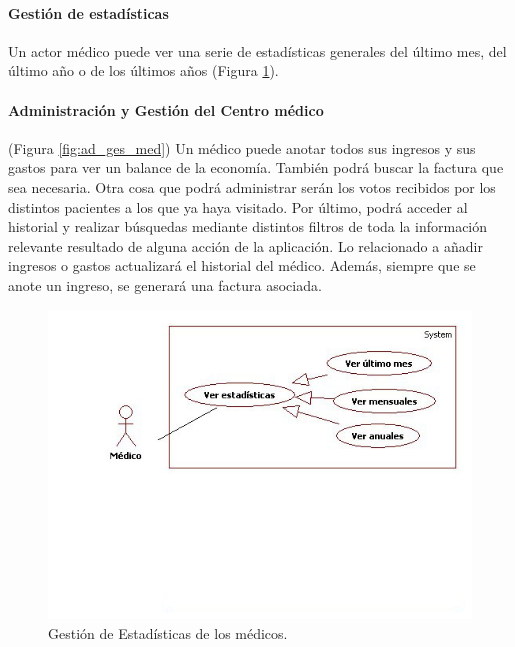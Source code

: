 			\paragraph{Gestión de estadísticas} %
			\label{par:gestion_de_estadisticas}
				Un actor médico puede ver una serie de estadísticas generales del último mes, del último año o de los últimos años (Figura \ref{fig:estad_med}). 
				
			
			
			\paragraph{Administración y Gestión del Centro médico} %
			\label{par:administracion_y_gestion_del_centro_medico}
				
				(Figura \ref{fig:ad_ges_med}) Un médico puede anotar todos sus ingresos y sus gastos para ver un balance de la economía. También podrá buscar la factura que sea necesaria. Otra cosa que podrá administrar serán los votos recibidos por los distintos pacientes a los que ya haya visitado. Por último, podrá acceder al historial y realizar búsquedas mediante distintos filtros de toda la información relevante resultado de alguna acción de la aplicación. Lo relacionado a añadir ingresos o gastos actualizará el historial del médico. Además, siempre que se anote un ingreso, se generará una factura asociada.
				
				\begin{figure}[H]
				  \centering
				    \includegraphics[width=12cm]{img/jpg/casos_uso/Estadisticas.jpg}
				  \caption{Gestión de Estadísticas de los médicos.}
				  \label{fig:estad_med}
				\end{figure}
				
